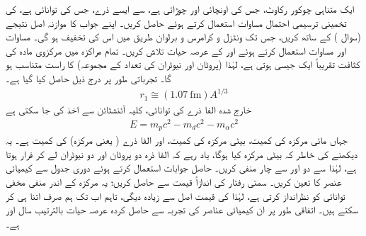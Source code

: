 ایک متناہی چوکور رکاوٹ، جس کی اونچائی  اور چوڑائی  ہے، سے ایسے ذرے، جس کی توانائی  ہے، کی تخمینی ترسیمی احتمال مساوات  استعمال کرتے ہوئے حاصل کریں۔ اپنے جواب کا موازنہ اصل نتیجے (سوال ) کے ساتھ کریں، جس تک ونٹزل و کرامرس و برلوان طریق  میں اس کی تخفیف ہو گی۔
مساوات  اور مساوات  استعمال کرتے ہوئے  اور  کے عرصہ حیات تلاش کریں۔ تمام مراکزہ میں مرکزوی مادہ کی کثافت تقریباً ایک جیسی ہوتی ہے، لہٰذا  (پروٹان اور نیوٹران کی تعداد کے مجموعہ)  کا راست متناسب ہو گا۔ تجرباتی طور پر درج ذیل حاصل کیا گیا ہے۔
\begin{align}
	r_{1}\cong(\SI{1.07}{\femto\meter})A^{1/3}
\end{align}
خارج شدہ الفا ذرے کی توانائی، کلیہ آئنشٹائن  سے اخذ کی جا سکتی ہے
\begin{align}
	E=m_{p}c^{2}-m_{d}c^{2}-m_{\alpha}c^{2}
\end{align}
جہاں  مائی مرکزہ کی کمیت،  بیٹی مرکزہ کی کمیت، اور  الفا ذرے ( یعنی  مرکزہ) کی کمیت ہے۔ یہ دیکھنے کی خاطر کہ بیٹی مرکزہ کیا ہوگا، یاد رہے کہ الفا ذرہ دو پروٹان اور دو نیوٹران لے کر فرار ہوتا ہے، لہٰذا  سے دو اور  سے چار منفی کریں۔ حاصل جوابات استعمال کرتے ہوئے دوری جدول سے کیمیائی عنصر کا تعین کریں۔ سمتی رفتار  کی اندازاً قیمت  سے حاصل کریں؛ یہ مرکزہ کے اندر منفی مخفی توانائی کو نظرانداز کرتی ہے، لہٰذا  کی قیمت اصل سے زیادہ دیگی، تاہم اب تک ہم صرف اتنا ہی کر سکتے ہیں۔ اتفاقی طور پر ان کیمیائی عناصر کی تجربہ سے حاصل کردہ عرصہ حیات بالترتیب  سال اور  ہے۔

